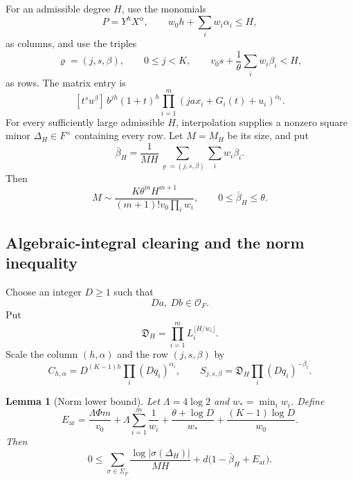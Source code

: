 \documentclass[11pt]{article}
\newcommand{\OO}{\mathcal O}
\newtheorem{lemma}[theorem]{Lemma}
\theoremstyle{definition}
\theoremstyle{remark}
\numberwithin{equation}{section}
\begin{document}
For an admissible degree $H$, use the monomials
\[
 P=Y^hX^\alpha,
 \qquad w_0h+\sum_iw_i\alpha_i\le H,
\]
as columns, and use the triples
\[
 \varrho=(j,s,\beta),\qquad
 0\le j<K,
 \qquad v_0s+\frac1\theta\sum_iw_i\beta_i<H,
\]
as rows.  The matrix entry is
\begin{equation}\label{eq:matrix-entry}
 [t^su^\beta]\,
 b^{jh}(1+t)^h
 \prod_{i=1}^m(ja x_i+G_i(t)+u_i)^{\alpha_i}.
\end{equation}
For every sufficiently large admissible $H$, interpolation supplies a
nonzero square minor $\Delta_H\in F^\times$ containing every row.  Let
$M=M_H$ be its size, and put
\begin{equation}\label{eq:bbar}
 \bar\beta_H=\frac1{MH}
 \sum_{\varrho=(j,s,\beta)}\sum_iw_i\beta_i.
\end{equation}
Then
\begin{equation}\label{eq:row-asymptotic}
 M\sim
 \frac{K\theta^mH^{m+1}}
 {(m+1)!v_0\prod_iw_i},
 \qquad 0\le\bar\beta_H\le\theta.
\end{equation}

\subsection{Algebraic-integral clearing and the norm inequality}

Choose an integer $D\ge1$ such that
\[
 Da,\ Db\in\OO_F.
\]
Put
\[
 \mathfrak D_H=\prod_{i=1}^mL_i^{\lfloor H/w_i\rfloor}.
\]
Scale the column $(h,\alpha)$ and the row $(j,s,\beta)$ by
\begin{equation}\label{eq:scales}
 C_{h,\alpha}=D^{(K-1)h}\prod_i(Dq_i)^{\alpha_i},
 \qquad
 S_{j,s,\beta}=\mathfrak D_H\prod_i(Dq_i)^{-\beta_i}.
\end{equation}

\begin{lemma}[Norm lower bound]\label{lem:norm}
Let $\Lambda=4\log2$ and $w_*=\min_iw_i$.  Define
\begin{equation}\label{eq:Ear}
 E_{\mathrm{ar}}=
 \frac{\Lambda\Phi m}{v_0}
 +\Lambda\sum_{i=1}^m\frac1{w_i}
 +\frac{\theta+\log D}{w_*}
 +\frac{(K-1)\log D}{w_0}.
\end{equation}
Then
\begin{equation}\label{eq:norm-inequality}
 0\le
 \sum_{\sigma\in\Sigma_F}
 \frac{\log|\sigma(\Delta_H)|}{MH}
 +d\bigl(1-\bar\beta_H+E_{\mathrm{ar}}\bigr).
\end{equation}
\end{lemma}
\end{document}
